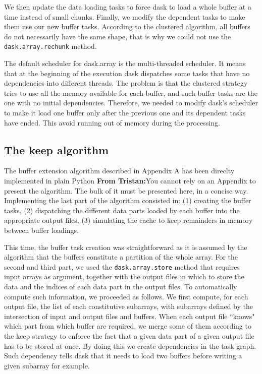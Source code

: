\documentclass[conference]{IEEEtran}
\newcommand{\tristan}[1]{\color{orange}\textbf{From Tristan:}#1\color{black}}
\begin{document}
We then update the data loading tasks to force dask to load a whole buffer at
a time instead of small chunks. Finally, we modify the dependent tasks to make
them use our new buffer tasks. According to the clustered algorithm, all buffers
do not necessarily have the same shape, that is why we could not use the
\texttt{dask.array.rechunk} method.

The default scheduler for dask.array is the multi-threaded scheduler. It means
that at the beginning of the execution dask dispatches some tasks that have
no dependencies into different threads. The problem is that the clustered
strategy tries to use all the memory available for each buffer, and such buffer
tasks are the one with no initial dependencies. Therefore, we needed to
modify dask's scheduler to make it load one buffer only after the previous one
and its dependent tasks have ended. This avoid running out of memory during the
processing.

\subsection{The keep algorithm}

The buffer extension algorithm described in Appendix A has been direclty
implemented in plain Python \tristan{You cannot rely on an Appendix to present the algorithm. The bulk of it must be presented here, in a
concise way}. Implementing the last part of the algorithm
consisted in: (1) creating the buffer tasks, (2) dispatching the different data
parts loaded by each buffer into the appropriate output files, (3) simulating
the cache to keep remainders in memory between buffer loadings.

This time, the buffer task creation was straightforward as it is assumed by the
algorithm that the buffers constitute a partition of the whole array. For the
second and third part, we used the \texttt{dask.array.store} method that
requires input arrays as argument, together with the output files in which to
store the data and the indices of each data part in the output files. To
automatically compute such information, we proceeded as follows. We first
compute, for each output file, the list of each constitutive subarrays, with
subarrays defined by the intersection of input and output files and buffers.
When each output file ``knows" which part from which buffer are required, we
merge some of them according to the keep strategy to enforce the fact that
a given data part of a given output file has to be stored at once. By doing this
we create dependencies in the task graph. Such dependency tells dask that it
needs to load two buffers before writing a given subarray for example.
\end{document}
